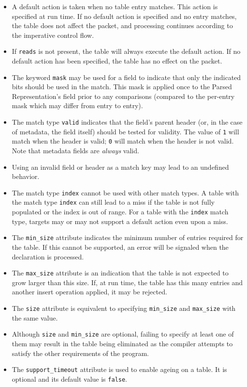 \documentclass[12pt]{article}
\begin{document}
\begin{itemize}
\item
A default action is taken when no table entry matches. This action is specified 
at run time. If no default action is specified and no entry matches, the table 
does not affect the packet, and processing continues according to the imperative 
control flow.
\item
If \texttt{reads} is not present, the table will always execute the default action. 
If no default action has been specified, the table has no effect on the packet.
\item
The keyword \texttt{mask} may be used for a field to indicate that only the indicated 
bits should be used in the match. This mask is applied once to the Parsed 
Representation's field prior to any comparisons (compared to the per-entry 
mask which may differ from entry to entry).
\item
The match type \texttt{valid} indicates that the field's parent header (or, in the 
case of metadata, the field itself) should be tested for validity.  The value 
of \texttt{1} will match when the header is valid; \texttt{0} will match when the header is 
not valid. Note that metadata fields are \textit{always} valid.
\item
Using an invalid field or header as a match key may lead to an undefined behavior. 
\item
The match type \texttt{index} cannot be used with other match types.
A table with the match type \texttt{index} can still lead to a miss if the table 
is not fully populated or the index is out of range. For a table with the 
\texttt{index} match type, targets may or may not support a default action even upon a miss. 
\item
The \texttt{min_size} attribute indicates the minimum number of entries required 
for the table. If this cannot be supported, an error will be signaled when 
the declaration is processed.
\item
The \texttt{max_size} attribute is an indication that the table is not expected to 
grow larger than this size. If, at run time, the table has this many entries 
and another insert operation applied, it may be rejected.
\item
The \texttt{size} attribute is equivalent to specifying \texttt{min_size} and \texttt{max_size} with 
the same value.
\item
Although \texttt{size} and \texttt{min_size} are optional, failing to specify at least one 
of them may result in the table being eliminated as the compiler attempts 
to satisfy the other requirements of the program.
\item
The \texttt{support_timeout} attribute is used to enable ageing on a table. It
is optional and its default value is \texttt{false}.
\end{itemize}
\end{document}
